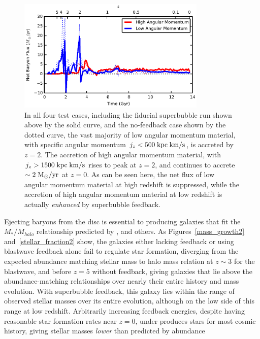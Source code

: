 \begin{figure}
    \includegraphics[width=0.8\textwidth]{figures2/angular_momentum_netflux.eps}
    \caption[Net accretion as a function of angular momentum]{In all four test
    cases, including the fiducial superbubble run shown above by the solid
    curve, and the no-feedback case shown by the dotted curve, the vast majority
    of low angular momentum material, with specific angular momentum $ j_z <
    500\; \rm {kpc\; km/s}$, is accreted by $z=2$.  The accretion of high
    angular momentum material, with $j_z > 1500\; \rm{kpc\; km/s}$ rises to peak
    at $z=2$, and continues to accrete $\sim 2\; \rm{M_\odot/yr}$ at $z=0$.  As
    can be seen here, the net flux of low angular momentum material at high
    redshift is suppressed, while the accretion of high angular momentum
    material at low redshift is actually {\it enhanced} by superbubble
    feedback.}
        \label{angular_momentum_netflux2}
\end{figure}
Ejecting baryons from the disc is essential to producing galaxies that fit the
$M_*/M_{halo}$ relationship predicted by \citet{Behroozi2013},
\citet{Moster2013} and others.  As Figures~\ref{mass_growth2}
and~\ref{stellar_fraction2} show, the galaxies either lacking feedback or using
blastwave feedback alone fail to regulate star formation, diverging from the
expected abundance matching stellar mass to halo mass relation at $z\sim3$ for
the blastwave, and before $z=5$ without feedback, giving galaxies that lie above
the abundance-matching relationships over nearly their entire history and mass
evolution.  With superbubble feedback, this galaxy lies within the range of
observed stellar masses over its entire evolution, although on the low side of
this range at low redshift.  Arbitrarily increasing feedback energies, despite
having reasonable star formation rates near $z=0$, under produces stars for most
cosmic history, giving stellar masses {\it lower} than predicted by abundance

